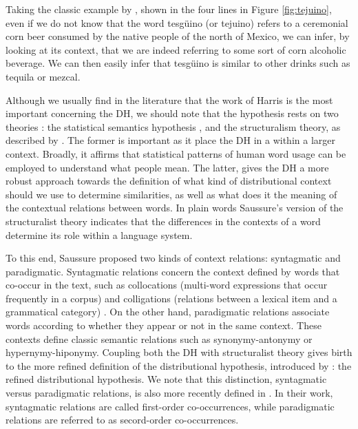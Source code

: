 Taking the classic example by \cite{nida1979componential}, shown in the four lines  in Figure \ref{fig:tejuino}, even if we do not know that the word tesg\"{u}ino (or tejuino) refers to a ceremonial corn beer consumed by the native people of the north of Mexico, we can infer, by looking at its context, that we are indeed referring to some sort of corn alcoholic beverage. We can then easily infer that tesg\"{u}ino is similar to other drinks such as tequila or mezcal.

Although we usually find in the literature that the work of Harris is the most important concerning the DH, we should note that the hypothesis rests on two theories  \cite{sahlgren2008distributional,turney2010}: the statistical semantics hypothesis \cite{booth1955machine}, and the  structuralism theory, as described by \cite{de1916course}. The former is important as it place the DH in a within a larger context. Broadly, it affirms that statistical patterns of human word usage can be employed to understand what people mean. The latter,  gives the DH a more robust approach towards the definition of what kind of distributional context should we use to determine similarities, as well as what does it the meaning of the contextual relations between words. In plain words Saussure's version of the structuralist theory indicates that the differences in the contexts of a word determine its role within a language system. 

To this end, Saussure proposed two kinds of context relations: syntagmatic and paradigmatic. Syntagmatic relations concern the context defined by words that co-occur in the text, such as collocations (multi-word expressions that occur frequently in a corpus) and colligations (relations between a lexical item and a grammatical category) \cite{verschueren2015handbook}. On the other hand, paradigmatic relations associate words according to whether they appear or not in the same context. These contexts define classic semantic relations such as synonymy-antonymy or hypernymy-hiponymy. Coupling both the DH with structuralist theory gives birth to the more refined definition of the distributional hypothesis, introduced by \cite{sahlgren2008distributional}: the refined distributional hypothesis. We note that this distinction, syntagmatic versus paradigmatic relations, is also more recently defined in \cite{schutze1993vector}. In their work, syntagmatic relations are called first-order co-occurrences, while paradigmatic relations  are referred to as secord-order co-occurrences.

